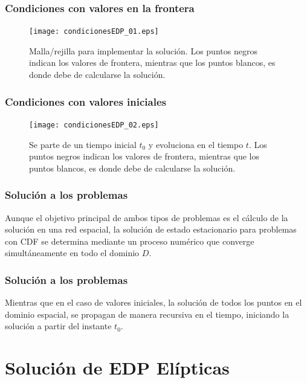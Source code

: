 \begin{frame}
\captionsetup{font=scriptsize,labelfont=scriptsize}
\frametitle{Condiciones con valores en la frontera}
\begin{figure}
	\centering
	\texttt{[image: condicionesEDP\_01.eps]}
	\caption{Malla/rejilla para implementar la solución. Los puntos negros indican los valores de frontera, mientras que los puntos blancos, es donde debe de calcularse la solución.}
\end{figure}
\end{frame}
\begin{frame}
\captionsetup{font=scriptsize,labelfont=scriptsize}
\frametitle{Condiciones con valores iniciales}
\begin{figure}
	\centering
	\texttt{[image: condicionesEDP\_02.eps]}
	\caption{Se parte de un tiempo inicial $t_{0}$ y evoluciona en el tiempo $t$. Los puntos negros indican los valores de frontera, mientras que los puntos blancos, es donde debe de calcularse la solución.}
\end{figure}
\end{frame}
\begin{frame}
\frametitle{Solución a los problemas}
Aunque el objetivo principal de ambos tipos de problemas es el cálculo de la solución en una red espacial, la solución de estado estacionario para problemas con CDF se determina mediante un proceso numérico que converge simultáneamente en todo el dominio $D$.
\end{frame}
\begin{frame}
\frametitle{Solución a los problemas}
Mientras que en el caso de valores iniciales, la solución de todos los puntos en el dominio espacial, se propagan de manera recursiva en el tiempo, iniciando la solución a partir del instante $t_{0}$.
\end{frame}
\section{Solución de EDP Elípticas}
